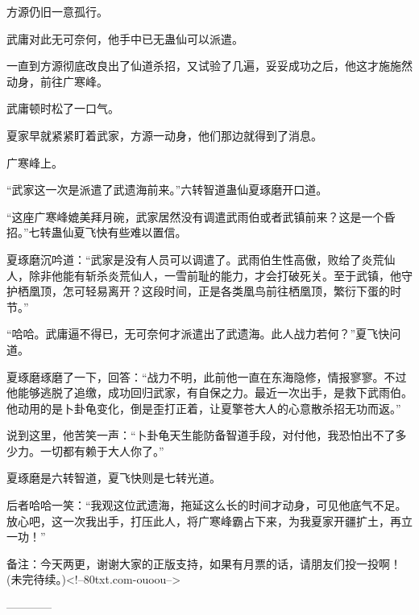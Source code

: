 \begin{this_body}
方源仍旧一意孤行。

武庸对此无可奈何，他手中已无蛊仙可以派遣。

一直到方源彻底改良出了仙道杀招，又试验了几遍，妥妥成功之后，他这才施施然动身，前往广寒峰。

武庸顿时松了一口气。

夏家早就紧紧盯着武家，方源一动身，他们那边就得到了消息。

广寒峰上。

“武家这一次是派遣了武遗海前来。”六转智道蛊仙夏琢磨开口道。

“这座广寒峰媲美拜月碗，武家居然没有调遣武雨伯或者武镇前来？这是一个昏招。”七转蛊仙夏飞快有些难以置信。

夏琢磨沉吟道：“武家是没有人员可以调遣了。武雨伯生性高傲，败给了炎荒仙人，除非他能有斩杀炎荒仙人，一雪前耻的能力，才会打破死关。至于武镇，他守护栖凰顶，怎可轻易离开？这段时间，正是各类凰鸟前往栖凰顶，繁衍下蛋的时节。”

“哈哈。武庸逼不得已，无可奈何才派遣出了武遗海。此人战力若何？”夏飞快问道。

夏琢磨琢磨了一下，回答：“战力不明，此前他一直在东海隐修，情报寥寥。不过他能够逃脱了追缴，成功回归武家，有自保之力。最近一次出手，是救下武雨伯。他动用的是卜卦龟变化，倒是歪打正着，让夏擎苍大人的心意散杀招无功而返。”

说到这里，他苦笑一声：“卜卦龟天生能防备智道手段，对付他，我恐怕出不了多少力。一切都有赖于大人你了。”

夏琢磨是六转智道，夏飞快则是七转光道。

后者哈哈一笑：“我观这位武遗海，拖延这么长的时间才动身，可见他底气不足。放心吧，这一次我出手，打压此人，将广寒峰霸占下来，为我夏家开疆扩土，再立一功！”

备注：今天两更，谢谢大家的正版支持，如果有月票的话，请朋友们投一投啊！(未完待续。)<!--80txt.com-ouoou-->

------------

\end{this_body}

